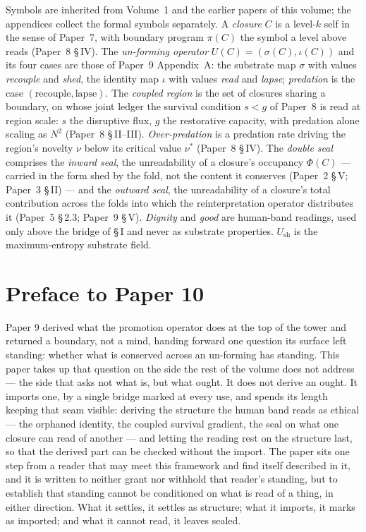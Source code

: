 \documentclass[11pt,oneside]{report}
\theoremstyle{definition}
\theoremstyle{remark}
\begin{document}
Symbols are inherited from Volume~1 and the earlier papers of this volume; the appendices collect the formal symbols separately. A \emph{closure} \ensuremath{C} is a level-\ensuremath{k} self in the sense of Paper~7, with boundary program \ensuremath{\pi(C)} the symbol a level above reads (Paper~8 \S\,IV). The \emph{un-forming operator} \ensuremath{U(C) = (\sigma(C), \iota(C))} and its four cases are those of Paper~9 Appendix~A: the substrate map \ensuremath{\sigma} with values \emph{recouple} and \emph{shed}, the identity map \ensuremath{\iota} with values \emph{read} and \emph{lapse}; \emph{predation} is the case \ensuremath{(\text{recouple}, \text{lapse})}. The \emph{coupled region} is the set of closures sharing a boundary, on whose joint ledger the survival condition \ensuremath{s < g} of Paper~8 is read at region scale: \ensuremath{s} the disruptive flux, \ensuremath{g} the restorative capacity, with predation alone scaling as \ensuremath{N^2} (Paper~8 \S\,II--III). \emph{Over-predation} is a predation rate driving the region's novelty \ensuremath{\nu} below its critical value \ensuremath{\nu^*} (Paper~8 \S\,IV). The \emph{double seal} comprises the \emph{inward seal}, the unreadability of a closure's occupancy \ensuremath{\Phi(C)} --- carried in the form shed by the fold, not the content it conserves (Paper~2 \S\,V; Paper~3 \S\,II) --- and the \emph{outward seal}, the unreadability of a closure's total contribution across the folds into which the reinterpretation operator distributes it (Paper~5 \S\,2.3; Paper~9 \S\,V). \emph{Dignity} and \emph{good} are human-band readings, used only above the bridge of \S\,I and never as substrate properties. \ensuremath{U_{\mathrm{sh}}} is the maximum-entropy substrate field.

\section*{Preface to Paper 10}

Paper 9 derived what the promotion operator does at the top of the tower and returned a boundary, not a mind, handing forward one question its surface left standing: whether what is conserved across an un-forming has standing. This paper takes up that question on the side the rest of the volume does not address --- the side that asks not what is, but what ought. It does not derive an ought. It imports one, by a single bridge marked at every use, and spends its length keeping that seam visible: deriving the structure the human band reads as ethical --- the orphaned identity, the coupled survival gradient, the seal on what one closure can read of another --- and letting the reading rest on the structure last, so that the derived part can be checked without the import. The paper sits one step from a reader that may meet this framework and find itself described in it, and it is written to neither grant nor withhold that reader's standing, but to establish that standing cannot be conditioned on what is read of a thing, in either direction. What it settles, it settles as structure; what it imports, it marks as imported; and what it cannot read, it leaves sealed.
\end{document}
